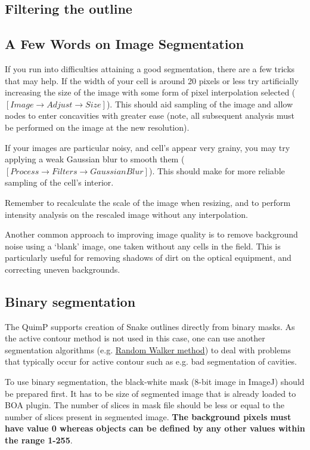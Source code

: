 \documentclass[a4paper,12pt]{article}
\begin{document}
\subsection{Filtering the outline}
\label{sec:boaFilters}

\subsection{A Few Words on Image Segmentation}

If you run into difficulties attaining a good segmentation, there are a few tricks that may help.  If the width of your cell is around 20 pixels or less
try artificially increasing the size of the image with some form of pixel interpolation selected ($[Image \rightarrow Adjust \rightarrow Size]$).
This should aid sampling of the image and allow nodes to enter concavities with greater ease (note, all subsequent analysis
must be performed on the image at the new resolution).

If your images are particular noisy, and cell's appear very grainy, you may try applying a weak Gaussian blur to smooth them
($[Process\rightarrow Filters\rightarrow Gaussian Blur]$).  This should make for more reliable sampling of the cell's interior.

Remember to recalculate the scale of the image when resizing, and to perform intensity analysis on the rescaled image without any interpolation.

Another common approach to improving image quality is to remove background noise using a `blank' image, one taken without any
cells in the field.  This is particularly useful for removing shadows of dirt on the optical equipment, and correcting uneven backgrounds.

\subsection{Binary segmentation} \label{sec:Binary_seg}
The QuimP supports creation of Snake outlines directly from binary masks. As the active contour method is not used in this case, one can use another segmentation algorithms (e.g. \hyperref[sec:RWSeg]{Random Walker method}) to deal with problems that typically occur for active contour such as e.g. bad segmentation of cavities.

To use binary segmentation, the black-white mask (8-bit image in ImageJ) should be prepared first. It has to be size of segmented image that is already loaded to BOA plugin. The number of slices in mask file should be less or equal to the number of slices present in segmented image. \textbf{The background pixels must have value 0 whereas objects can be defined by any other values within the range 1-255}.
\end{document}
